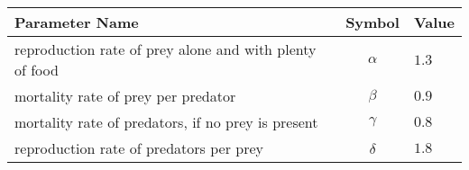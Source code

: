\begin{tabular}{lcl}
\hline
 Parameter Name                                          &  Symbol  & Value   \\
\hline
 reproduction rate of prey alone and with plenty of food & $\alpha$ & $1.3$   \\
 mortality rate of prey per predator                     & $\beta$  & $0.9$   \\
 mortality rate of predators, if no prey is present      & $\gamma$ & $0.8$   \\
 reproduction rate of predators per prey                 & $\delta$ & $1.8$   \\
\hline
\end{tabular}